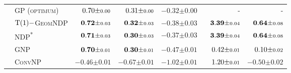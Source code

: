 \begin{table}[t]
\begin{tabular}{llrrrrr}
		\midrule
		\parbox[t]{2mm}{}
		 & \scshape GP (optimum)                                   & \(\hphantom{-}0.70 { \pm \scriptstyle 0.00 }\)                                  & \(\hphantom{-}0.31 { \pm \scriptstyle 0.00 }\)                                  & \(-0.32 { \pm \scriptstyle 0.00 }\)                                  & -                                                                             & -                                                                             \\
		 & \scshape \(\groupT[1]{}-\)GeomNDP &  \(\hphantom{-}\mathbf{0.72} { \pm \scriptstyle 0.03 }\) &  \(\hphantom{-}\mathbf{0.32} { \pm \scriptstyle 0.03 }\) &  \(\mathbf{-0.38} { \pm \scriptstyle 0.03 }\) &  \(\hphantom{-}\mathbf{3.39} { \pm \scriptstyle 0.04 }\) &  \(\hphantom{-}\mathbf{0.64} { \pm \scriptstyle 0.08 }\) \\
		 & \scshape NDP\textsuperscript{*}                         & \(\hphantom{-}\mathbf{0.71} { \pm \scriptstyle 0.03 }\)                         & \(\hphantom{-}\mathbf{0.30} { \pm \scriptstyle 0.03 }\)                         & \(\mathbf{-0.37} { \pm \scriptstyle 0.03 }\)                         & \(\hphantom{-}\mathbf{3.39} { \pm \scriptstyle 0.04 }\)                         & \(\hphantom{-}\mathbf{0.64} { \pm \scriptstyle 0.08 }\)                         \\
		 & \scshape GNP                                            & \(\hphantom{-}\mathbf{0.70} { \pm \scriptstyle 0.01 }\)                         & \(\hphantom{-}\mathbf{0.30} { \pm \scriptstyle 0.01 }\)                         & \(-0.47 { \pm \scriptstyle 0.01 }\)                                  & \(\hphantom{-}0.42 { \pm \scriptstyle 0.01 }\)                                  & \(\hphantom{-}0.10 { \pm \scriptstyle 0.02 }\)                                  \\
		 & \scshape ConvNP                                         & \(-0.46 { \pm \scriptstyle 0.01 }\)                                             & \(-0.67 { \pm \scriptstyle 0.01 }\)                                             & \(-1.02 { \pm \scriptstyle 0.01 }\)                                  & \(\hphantom{-}1.20 { \pm \scriptstyle 0.01 }\)                                  & \(-0.50 { \pm \scriptstyle 0.02 }\)                                             \\


\end{tabular}
\end{table}
